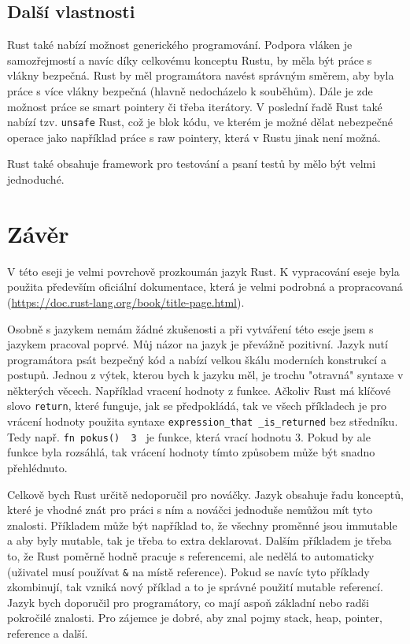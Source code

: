 \documentclass[12pt, letterpaper]{article}
\begin{document}
\subsection{Další vlastnosti}
Rust také nabízí možnost generického programování. Podpora vláken je samozřejmostí a navíc díky celkovému
konceptu Rustu, by měla být práce s vlákny bezpečná. Rust by měl programátora navést správným směrem, aby
byla práce s více vlákny bezpečná (hlavně nedocházelo k souběhům). Dále je zde možnost práce se smart
pointery či třeba iterátory. V poslední řadě Rust také nabízí tzv. \texttt{unsafe} Rust, což je blok
kódu, ve kterém je možné dělat nebezpečné operace jako například práce s raw pointery, která v Rustu
jinak není možná.

Rust také obsahuje framework pro testování a psaní testů by mělo být velmi jednoduché.
%
\section{Závěr}
V této eseji je velmi povrchově prozkoumán jazyk Rust. K vypracování eseje byla použita především
oficiální dokumentace, která je velmi podrobná a propracovaná
(\url{https://doc.rust-lang.org/book/title-page.html}).

Osobně s jazykem nemám žádné zkušenosti a při vytváření této eseje jsem s jazykem pracoval poprvé. Můj
názor na jazyk je převážně pozitivní. Jazyk nutí programátora psát bezpečný kód a nabízí velkou škálu
moderních konstrukcí a postupů. Jednou z výtek, kterou bych k jazyku měl, je trochu "otravná" syntaxe v
některých věcech. Například vracení hodnoty z funkce. Ačkoliv Rust má klíčové slovo \texttt{return},
které funguje, jak se předpokládá, tak ve všech příkladech je pro vrácení hodnoty použita syntaxe 
\texttt{expression\_that
\_is\_returned} bez středníku. Tedy např. \texttt{fn pokus() { 3 }} je funkce,
která vrací hodnotu 3. Pokud by ale funkce byla rozsáhlá, tak vrácení hodnoty tímto způsobem může
být snadno přehlédnuto.

Celkově bych Rust určitě nedoporučil pro nováčky. Jazyk obsahuje řadu konceptů, které je vhodné znát pro
práci s ním a nováčci jednoduše nemůžou mít tyto znalosti. Příkladem může být například to, že všechny
proměnné jsou immutable a aby byly mutable, tak je třeba to extra deklarovat. Dalším příkladem je
třeba to, že Rust poměrně hodně pracuje s referencemi, ale nedělá to automaticky (uživatel musí používat
\texttt{\&} na místě reference). Pokud se navíc tyto příklady zkombinují, tak vzniká nový příklad a to je
správné použití mutable referencí. Jazyk bych doporučil pro programátory, co mají aspoň základní nebo
radši pokročilé znalosti. Pro zájemce je dobré, aby znal pojmy stack, heap, pointer, reference a další.
\end{document}

